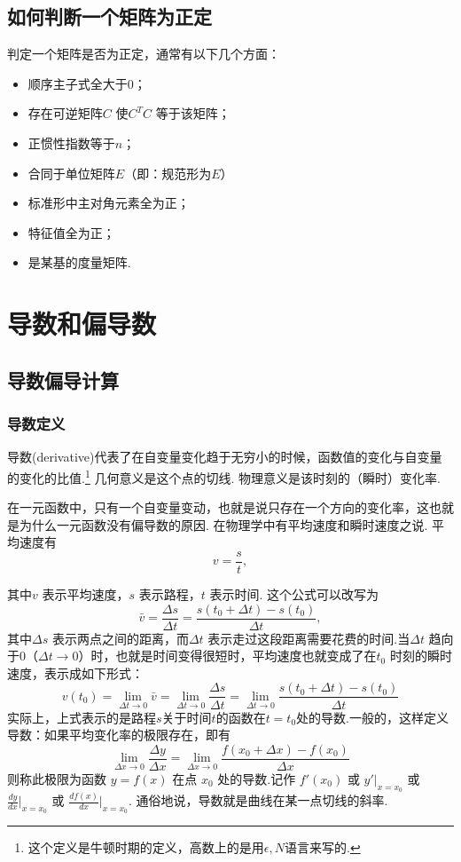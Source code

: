 \subsection{如何判断一个矩阵为正定}
\label{ux5982ux4f55ux5224ux65adux4e00ux4e2aux77e9ux9635ux4e3aux6b63ux5b9a}

判定一个矩阵是否为正定，通常有以下几个方面：

\begin{itemize}
 
\item
  顺序主子式全大于0；
\item
  存在可逆矩阵\(C\) 使\(C^TC\) 等于该矩阵；
\item
  正惯性指数等于\(n\)；
\item
  合同于单位矩阵\(E\)（即：规范形为\(E\)）
\item
  标准形中主对角元素全为正；
\item
  特征值全为正；
\item
  是某基的度量矩阵.
\end{itemize}

\section{导数和偏导数}
\label{ux5bfcux6570ux548cux504fux5bfcux6570}
\subsection{导数偏导计算}
\label{ux5bfcux6570ux504fux5bfcux8ba1ux7b97}
\subsubsection{导数定义}
\label{sec:2.1.1}

导数(derivative)代表了在自变量变化趋于无穷小的时候，函数值的变化与自变量的变化的比值.\footnote{这个定义是牛顿时期的定义，高数上的是用$\epsilon ,N $语言来写的.}
几何意义是这个点的切线.
物理意义是该时刻的（瞬时）变化率.

\begin{notes}
  在一元函数中，只有一个自变量变动，也就是说只存在一个方向的变化率，这也就是为什么一元函数没有偏导数的原因.
  在物理学中有平均速度和瞬时速度之说.
  平均速度有
  \[
v=\frac{s}{t},
\]

其中\(v\) 表示平均速度，\(s\) 表示路程，\(t\) 表示时间.
这个公式可以改写为
\[
\bar{v}=\frac{\Delta s}{\Delta t}=\frac{s(t_0+\Delta t)-s(t_0)}{\Delta t},
\]
其中\(\Delta s\) 表示两点之间的距离，而\(\Delta t\) 表示走过这段距离需要花费的时间.当\(\Delta t\) 趋向于0（\(\Delta t \to 0\)）时，也就是时间变得很短时，平均速度也就变成了在\(t_0\) 时刻的瞬时速度，表示成如下形式：
\[
v(t_0)=\lim_{\Delta t \to 0}{\bar{v}}=\lim_{\Delta t \to 0}{\frac{\Delta s}{\Delta t}}=\lim_{\Delta t \to 0}{\frac{s(t_0+\Delta t)-s(t_0)}{\Delta t}}
\]
实际上，上式表示的是路程\(s\)关于时间\(t\)的函数在\(t=t_0\)处的导数.一般的，这样定义导数：如果平均变化率的极限存在，即有
\[
\lim_{\Delta x \to 0}{\frac{\Delta y}{\Delta x}}=\lim_{\Delta x \to 0}{\frac{f(x_0+\Delta x)-f(x_0)}{\Delta x}}
\]
则称此极限为函数 \(y=f(x)\) 在点 \(x_0\) 处的导数.记作 \(f'(x_0)\) 或
\(y'\vert_{x=x_0}\) 或 \(\frac{dy}{dx}\vert_{x=x_0}\) 或
\(\frac{df(x)}{dx}\vert_{x=x_0}\).
通俗地说，导数就是曲线在某一点切线的斜率.
\end{notes}
